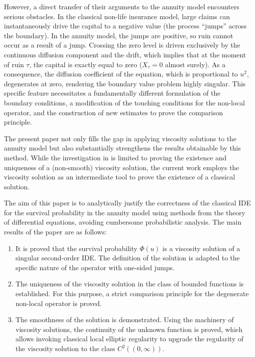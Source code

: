 \documentclass[smallextended]{svjour3}
\begin{document}
However, a direct transfer of their arguments to the annuity model encounters serious obstacles. In the classical non-life insurance model, large claims can instantaneously drive the capital to a negative value (the process ``jumps'' across the boundary). In the annuity model, the jumps are positive, so ruin cannot occur as a result of a jump. Crossing the zero level is driven exclusively by the continuous diffusion component and the drift, which implies that at the moment of ruin $\tau$, the capital is exactly equal to zero ($X_\tau = 0$ almost surely). As a consequence, the diffusion coefficient of the equation, which is proportional to $u^2$, degenerates at zero, rendering the boundary value problem highly singular. This specific feature necessitates a fundamentally different formulation of the boundary conditions, a modification of the touching conditions for the non-local operator, and the construction of new estimates to prove the comparison principle.

The present paper not only fills the gap in applying viscosity solutions to the annuity model but also substantially strengthens the results obtainable by this method. While the investigation in \cite{BK2015} is limited to proving the existence and uniqueness of a (non-smooth) viscosity solution, the current work employs the viscosity solution as an intermediate tool to prove the existence of a classical solution.

The aim of this paper is to analytically justify the correctness of the classical IDE for the survival probability in the annuity model using methods from the theory of differential equations, avoiding cumbersome probabilistic analysis. The main results of the paper are as follows:
\begin{enumerate}
    \item It is proved that the survival probability $\Phi(u)$ is a viscosity solution of a singular second-order IDE. The definition of the solution is adapted to the specific nature of the operator with one-sided jumps.
    \item The uniqueness of the viscosity solution in the class of bounded functions is established. For this purpose, a strict comparison principle for the degenerate non-local operator is proved.
    \item The smoothness of the solution is demonstrated. Using the machinery of viscosity solutions, the continuity of the unknown function is proved, which allows invoking classical local elliptic regularity to upgrade the regularity of the viscosity solution to the class $C^2((0, \infty))$. 
\end{enumerate}
\end{document}
